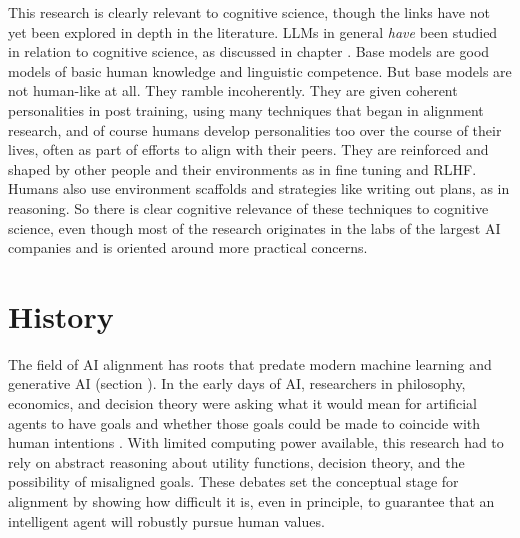 This research is clearly relevant to cognitive science, though the links have not yet been explored in depth in the literature. LLMs in general \emph{have} been studied in relation to cognitive science, as discussed in chapter . Base models are good models of basic human knowledge and linguistic competence. But base models are not human-like at all. They ramble incoherently. They are given coherent personalities in post training, using many techniques that began in alignment research,  and of course humans develop personalities too over the course of their lives, often as part of efforts to align with their peers. They are reinforced and shaped by other people and their environments as in fine tuning and RLHF.  Humans also use environment scaffolds and strategies like writing out plans, as in reasoning.  So there is clear cognitive relevance of these techniques to cognitive science, even though most of the research originates in the labs of the largest AI companies and is oriented around more practical concerns. 

\section{History}



The field of AI alignment has roots that predate modern machine learning and generative AI (section ). In the early days of AI, researchers in philosophy, economics, and decision theory were asking what it would mean for artificial agents to have goals and whether those goals could be made to coincide with human intentions \cite{von1944games,omohundro2008drives,bostrom2014superintelligence}. With limited computing power available, this research had to rely on abstract reasoning about utility functions, decision theory, and the possibility of misaligned goals.  These debates set the conceptual stage for alignment by showing how difficult it is, even in principle, to guarantee that an intelligent agent will robustly pursue human values.

